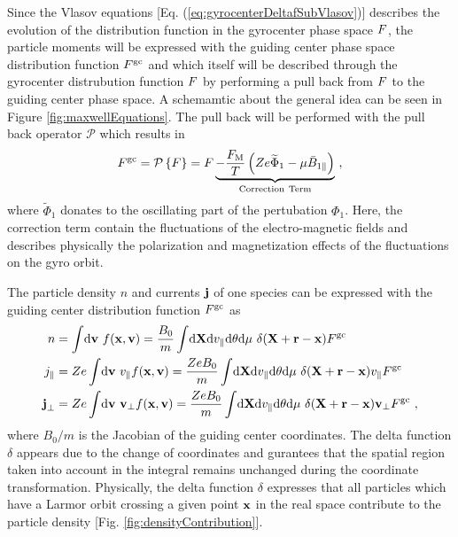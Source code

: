 Since the Vlasov equations [Eq. (\ref{eq:gyrocenterDeltafSubVlasov})] describes the evolution of the distribution function in the gyrocenter phase space $F$, the particle moments will be expressed with the guiding center phase space distribution function $F^\mathrm{gc}$ and which itself will be described through the gyrocenter distrubution function $F$ by performing a pull back from $F$ to the guiding center phase space. A schemamtic about the general idea can be seen in Figure \ref{fig:maxwellEquations}. The pull back will be performed with the pull back operator $\mathcal{P}$ which results in
\begin{gather}
	F^\mathrm{gc} = \mathcal{P} \left\{ F \right\} = F \underbrace{- \frac{F_\mathrm{M}}{T}\left(Ze \widetilde{\Phi}_1 - \mu \bar{B}_{1\parallel}\right)}_{\mathrm{Correction~Term}}~,
	\label{eq:pullback}
\end{gather}
where $\widetilde{\Phi}_1$ donates to the oscillating part of the pertubation $\Phi_1$. Here, the correction term contain the fluctuations of the electro-magnetic fields and describes physically the polarization and magnetization effects of the fluctuations on the gyro orbit. \cite{Brizard2007}
 

The particle density $n$ and currents $\boldsymbol{\mathbf{j}}$ of one species can be expressed with the guiding center distribution function $F^\mathrm{gc}$ as
\begin{gather}
	\begin{aligned}
		n &= \int \! \mathrm{d}\boldsymbol{\mathbf{v}} ~ f(\boldsymbol{\mathbf{x}}, \boldsymbol{\mathbf{v}}) = \frac{B_0}{m} \int \! \mathrm{d}\boldsymbol{\mathbf{X}}\mathrm{d}v_\parallel\mathrm{d}\theta\mathrm{d}\mu ~ \delta(\boldsymbol{\mathbf{X}} + \boldsymbol{\mathbf{r}} - \boldsymbol{\mathbf{x}}) F^\mathrm{gc} \\
		j_\parallel &= Ze \int \! \mathrm{d}\boldsymbol{\mathbf{v}} ~ v_\parallel f(\boldsymbol{\mathbf{x}}, \boldsymbol{\mathbf{v}})= \frac{Ze B_0}{m} \int \! \mathrm{d}\boldsymbol{\mathbf{X}}\mathrm{d}v_\parallel\mathrm{d}\theta\mathrm{d}\mu ~ \delta(\boldsymbol{\mathbf{X}} + \boldsymbol{\mathbf{r}} - \boldsymbol{\mathbf{x}}) v_\parallel F^\mathrm{gc} \\
		\boldsymbol{\mathbf{j}}_\perp &= Ze \int \! \mathrm{d}\boldsymbol{\mathbf{v}} ~ \boldsymbol{\mathbf{v}}_\perp f(\boldsymbol{\mathbf{x}}, \boldsymbol{\mathbf{v}}) = \frac{Ze B_0}{m} \int \! \mathrm{d}\boldsymbol{\mathbf{X}}\mathrm{d}v_\parallel\mathrm{d}\theta\mathrm{d}\mu ~ \delta(\boldsymbol{\mathbf{X}} + \boldsymbol{\mathbf{r}} - \boldsymbol{\mathbf{x}}) \boldsymbol{\mathbf{v}}_\perp F^\mathrm{gc} ~,
	\end{aligned}
	\label{eq:momentsGuidingCenter}
\end{gather}
where $B_0/m$ is the Jacobian of the guiding center coordinates. The delta function $\delta$ appears due to the change of coordinates and gurantees that the spatial region taken into account in the integral remains unchanged during the coordinate transformation. Physically, the delta function $\delta$ expresses that all particles which have a Larmor orbit crossing a given point $\boldsymbol{\mathbf{x}}$ in the real space contribute to the particle density [Fig. \ref{fig:densityContribution}]. 

